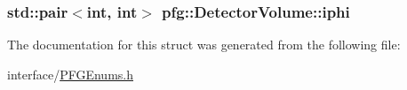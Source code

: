 \subsubsection[{iphi}]{\setlength{\rightskip}{0pt plus 5cm}std\+::pair$<$int, int$>$ pfg\+::\+Detector\+Volume\+::iphi}\label{structpfg_1_1_detector_volume_a7c0c028f18d816c5ff25ca5c3fefa32a}


The documentation for this struct was generated from the following file\+:\begin{DoxyCompactItemize}
\item 
interface/\hyperlink{_p_f_g_enums_8h}{P\+F\+G\+Enums.\+h}\end{DoxyCompactItemize}
